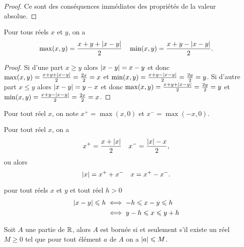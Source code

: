  \begin{proof}
    Ce sont des conséquences immédiates des propriétés de la valeur absolue.
  \end{proof}
  \begin{prop}
    Pour tous réels \(x\) et \(y\), on a
    \begin{equation}
      \max(x, y) = \frac{x + y + \left\lvert x - y\right\rvert}{2} \quad \min(x, y) = \frac{x + y 
      - \left\lvert x - y\right\rvert}{2}.
    \end{equation}
  \end{prop}
  \begin{proof}
    Si d'une part \(x\geqslant y\) alors \(\left\lvert x - y\right\rvert = x - y\) et donc
    \(\max(x, y) = \frac{x + y + \left\lvert x - y\right\rvert}{2} = \frac{2x}{2} = x\) et
    \(\min(x, y) = \frac{x + y - \left\lvert x - y\right\rvert}{2} = \frac{2y}{2} = y\). Si
    d'autre part \(x\leqslant y\) alors \(\left\lvert x - y\right\rvert = y - x\) et donc
    \(\max(x, y) = \frac{x + y + \left\lvert x - y\right\rvert}{2} = \frac{2y}{2} = y\) et
    \(\min(x, y) = \frac{x + y - \left\lvert x - y\right\rvert}{2} = \frac{2x}{2} = x\).
  \end{proof}
  \begin{defdef}
    Pour tout réel \(x\), on note \(x^+ = \max(x, 0)\) et \(x^- = \max( - x, 0)\).
  \end{defdef}
  \begin{prop}
    Pour tout réel \(x\), on a
    \begin{equation}
      x^+ = \frac{x + \left\lvert x\right\rvert}{2} \quad x^- = \frac{\left\lvert x\right\rvert - x}{2},
    \end{equation}
    ou alors
    \begin{equation}
        \left\lvert x\right\rvert = x^{+} + x^{-} \quad x = x^{+} - x^{-}.
    \end{equation}
  \end{prop}
  \begin{prop}
    pour tout réels \(x\) et \(y\) et tout réel \(h>0\)
    \begin{align}
      \left\lvert x - y\right\rvert\leqslant h &\iff -h \leqslant x - y \leqslant h\\
                             &\iff y - h \leqslant x \leqslant y + h
    \end{align}
  \end{prop}
  \begin{prop}
    Soit \(A\) une partie de \(\mathbb{R}\), alors \(A\) est bornée si et seulement s'il 
    existe un réel \(M\geqslant 0\) tel que pour tout élément \(a\) de \(A\) on 
    a \(\left\lvert a\right\rvert\leqslant M\).
  \end{prop}
